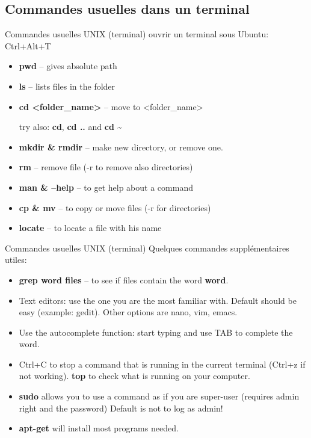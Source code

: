 \documentclass[9pt]{beamer}
\begin{document}
\subsection{Commandes usuelles dans un terminal}
\begin{frame}[fragile]{Commandes usuelles UNIX (terminal)}
ouvrir un terminal sous Ubuntu: Ctrl+Alt+T
   
\begin{itemize}
    \item \textbf{pwd} -- gives absolute path
    \item \textbf{ls} -- lists files in the folder
    \item \textbf{cd <folder\_name>} -- move to <folder\_name>
    
    try also: \textbf{cd}, \textbf{cd ..} and \textbf{cd \~}
    
    \item \textbf{mkdir \& rmdir} -- make new directory, or remove one.
    \item \textbf{rm} -- remove file (-r to remove also directories)
    \item \textbf{man \& --help} -- to get help about a command
    \item \textbf{cp \& mv} -- to copy or move files (-r for directories)
    \item \textbf{locate} -- to locate a file with his name
\end{itemize}
\end{frame}


\begin{frame}[fragile]{Commandes usuelles UNIX (terminal)}
    Quelques commandes supplémentaires utiles:
    \begin{itemize}
        \item \textbf{grep word files} -- to see if files contain the word \textbf{word}.
        \item Text editors: use the one you are the most familiar with. Default should be easy (example: gedit). Other options are nano, vim, emacs. 
        \item Use the autocomplete function: start typing and use TAB to complete the word.
        \item Ctrl+C to stop a command that is running in the current terminal (Ctrl+z if not working). \textbf{top} to check what is running on your computer. 
        \item \textbf{sudo} allows you to use a command as if you are super-user (requires admin right and the password) Default is not to log as admin!
        \item \textbf{apt-get} will install most programs needed. 
    \end{itemize}
    
\end{frame}
\end{document}

